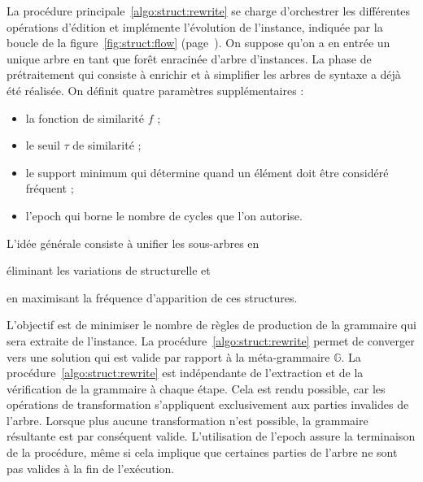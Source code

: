 La procédure principale~\ref{algo:struct:rewrite} se charge d'orchestrer les différentes opérations d'édition et implémente l'évolution de l'instance, indiquée par la boucle de la figure~\ref{fig:struct:flow} (page~\pageref{fig:struct:flow}).
On suppose qu'on a en entrée un unique arbre en tant que forêt enracinée d'arbre d'instances.
La phase de prétraitement qui consiste à enrichir et à simplifier les arbres de syntaxe a déjà été réalisée.
On définit quatre paramètres supplémentaires :
\begin{itemize}
    \item la fonction de similarité $f$ ;
    \item le seuil $\tau$ de similarité ;
    \item le support minimum qui détermine quand un élément doit être considéré fréquent ;
    \item l'epoch qui borne le nombre de cycles que l'on autorise.
\end{itemize}

L'idée générale consiste à unifier les sous-arbres en
\begin{enumerate*}[label=(\roman*)]
    \item éliminant les variations de structurelle et
    \item en maximisant la fréquence d'apparition de ces structures.
\end{enumerate*}
L'objectif est de minimiser le nombre de règles de production de la grammaire qui sera extraite de l'instance.
La procédure~\ref{algo:struct:rewrite} permet de converger vers une solution qui est valide par rapport à la méta-grammaire $\mathbb{G}$.
La procédure~\ref{algo:struct:rewrite} est indépendante de l'extraction et de la vérification de la grammaire à chaque étape.
Cela est rendu possible, car les opérations de transformation s'appliquent exclusivement aux parties invalides de l'arbre.
Lorsque plus aucune transformation n'est possible, la grammaire résultante est par conséquent valide.
L'utilisation de l'epoch assure la terminaison de la procédure, même si cela implique que certaines parties de l'arbre ne sont pas valides à la fin de l'exécution.

